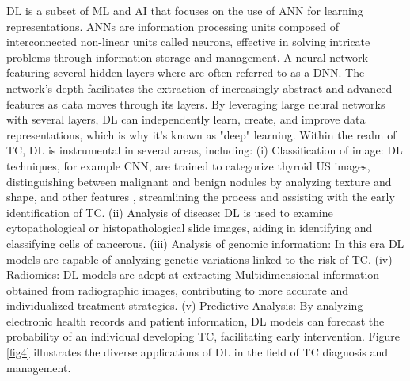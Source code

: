 \documentclass[a4paper,fleqn]{cas-sc}
\begin{document}
 \Ac{DL} is a subset of \ac{ML} and \ac{AI} that focuses on the use of \ac{ANN} for learning representations. \ac{ANN}s are information processing units composed of interconnected non-linear units called neurons, effective in solving intricate problems through information storage and management. A neural network featuring several hidden layers where are often referred to as a \ac{DNN}. The network's depth facilitates the extraction of increasingly abstract and advanced features as data moves through its layers. By leveraging large neural networks with several layers, \ac{DL} can independently learn, create, and improve data representations, which is why it's known as "deep" learning. Within the realm of TC, \ac{DL} is instrumental in several areas, including: (i) Classification of image: \ac{DL} techniques, for example \ac{CNN}, are trained to categorize thyroid \ac{US} images, distinguishing between malignant and benign nodules by analyzing texture and shape, and other features \cite{canton2021automatic, peng2021deep, guan2019deep}, streamlining the process and assisting with the early identification of TC. (ii) Analysis of disease: \ac{DL} is used to examine cytopathological or histopathological slide images, aiding in identifying and classifying cells of cancerous. (iii) Analysis of genomic information: In this era \ac{DL} models are capable of analyzing genetic variations linked to the risk of TC. (iv) Radiomics: \ac{DL} models are adept at extracting Multidimensional information obtained from radiographic images, contributing to more accurate and individualized treatment strategies. (v) Predictive Analysis: By analyzing electronic health records and patient information, \ac{DL} models can forecast the probability of an individual developing TC, facilitating early intervention. Figure \ref{fig4} illustrates the diverse applications of \ac{DL} in the field of TC diagnosis and management.
\end{document}
